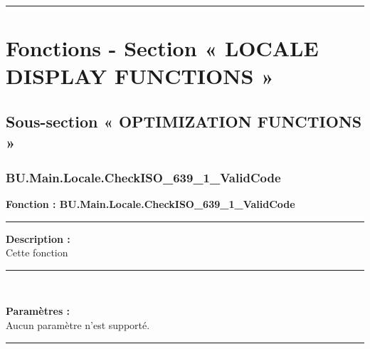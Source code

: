 \documentclass[a4paper,10pt]{article}
\begin{document}



    \color{sec1}\par\noindent\rule{\textwidth}{0.4pt}\color{text}

    \color{sec1}
    \section{Fonctions - Section « LOCALE DISPLAY FUNCTIONS »}\color{text}

    \color{sec2}
    \subsection{Sous-section « OPTIMIZATION FUNCTIONS »}\color{text}

    \color{sec3}
    \subsubsection{BU.Main.Locale.CheckISO\_639\_1\_ValidCode}\color{text}

    \textbf{Fonction : \color{func}BU.Main.Locale.CheckISO\_639\_1\_ValidCode}\setlength{\parskip}{1em}


    \par\noindent\rule{\textwidth}{0.4pt}

    \begin{justify}
        \textbf{Description :}\\[1\baselineskip]
        Cette fonction
    \end{justify}


    \par\noindent\rule{\textwidth}{0.4pt}\\

    \begin{justify}
        \textbf{Paramètres :}\\[1\baselineskip]
        Aucun paramètre n'est supporté.
    \end{justify}


    \par\noindent\rule{\textwidth}{0.4pt}
\end{document}

